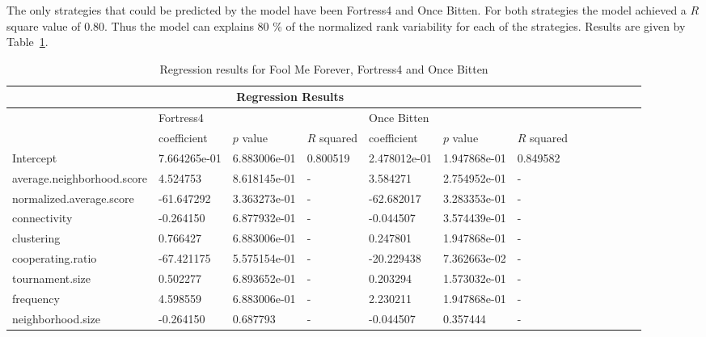 The only strategies that could be predicted by the model have been Fortress4 and
Once Bitten. For both strategies the model achieved a \(R\) square value of
0.80. Thus the model can explains 80 \% of the normalized rank variability for
each of the strategies. Results are given by Table~\ref{reg-for-r-top}.

\begin{table}[!hbtp]
	\centering
	\begin{adjustbox}{width=1\textwidth, height=0.2\textwidth}
		\small
		\begin{tabular}{|l|l|l|l|l|l|l|l|l|l|l|l|l|}
			\toprule
			\multicolumn{7}{|c|}{\textbf{Regression Results}}                                                                       \\ \hline
			&	\multicolumn{3}{l|}{Fortress4} & \multicolumn{3}{l|}{Once Bitten}\\ \hline
			  											   & coefficient & \(p\) value & \(R\) squared & coefficient & \(p\) value & \(R\) squared \\ \hline
			Intercept 								 & 7.664265e-01	& 6.883006e-01	& 0.800519	& 2.478012e-01 & 1.947868e-01 & 0.849582	\\ \hline
			average.neighborhood.score & 4.524753			& 8.618145e-01	& -					& 3.584271		 & 2.754952e-01	& -         \\ \hline
			normalized.average.score	 & -61.647292		& 3.363273e-01	& -					&-62.682017 	 & 3.283353e-01	& -         \\ \hline
			connectivity							 & -0.264150		& 6.877932e-01	& -					&-0.044507 		 & 3.574439e-01	& -         \\ \hline
			clustering  							 & 0.766427			& 6.883006e-01	& -					& 0.247801 		 & 1.947868e-01	& -         \\ \hline
			cooperating.ratio					 & -67.421175		& 5.575154e-01	& -					&-20.229438		 & 7.362663e-02	& -         \\ \hline
			tournament.size						 & 0.502277			& 6.893652e-01	& -					&0.203294  		 & 1.573032e-01	& -         \\ \hline
			frequency									 & 4.598559			& 6.883006e-01	& -					&2.230211  		 & 1.947868e-01	& -         \\ \hline
			neighborhood.size			   	 & -0.264150			& 0.687793		& -					&-0.044507 		 & 0.357444	& -         		\\ \bottomrule

		\end{tabular}
	\end{adjustbox}
	\caption{Regression results for ​Fool Me Forever, Fortress4 and Once Bitten}
	\label{reg-for-r-top}
\end{table}

